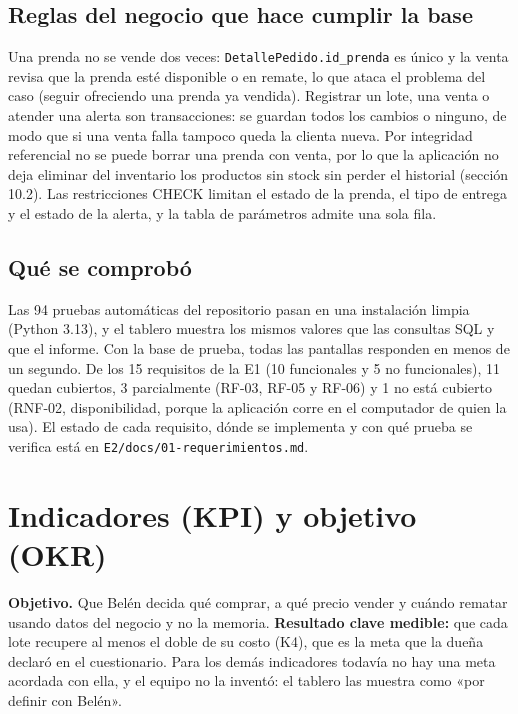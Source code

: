 \documentclass[11pt,letterpaper]{article}
\begin{document}
\subsection{Reglas del negocio que hace cumplir la base}

Una prenda no se vende dos veces: \texttt{DetallePedido.id\_\allowbreak{}prenda} es único y la venta revisa que la prenda esté disponible o en remate, lo que ataca el problema del caso (seguir ofreciendo una prenda ya vendida). Registrar un lote, una venta o atender una alerta son transacciones: se guardan todos los cambios o ninguno, de modo que si una venta falla tampoco queda la clienta nueva. Por integridad referencial no se puede borrar una prenda con venta, por lo que la aplicación no deja eliminar del inventario los productos sin stock sin perder el historial (sección 10.2). Las restricciones CHECK limitan el estado de la prenda, el tipo de entrega y el estado de la alerta, y la tabla de parámetros admite una sola fila.

\subsection{Qué se comprobó}

Las 94 pruebas automáticas del repositorio pasan en una instalación limpia (Python 3.13), y el tablero muestra los mismos valores que las consultas SQL y que el informe. Con la base de prueba, todas las pantallas responden en menos de un segundo. De los 15 requisitos de la E1 (10 funcionales y 5 no funcionales), 11 quedan cubiertos, 3 parcialmente (RF-03, RF-05 y RF-06) y 1 no está cubierto (RNF-02, disponibilidad, porque la aplicación corre en el computador de quien la usa). El estado de cada requisito, dónde se implementa y con qué prueba se verifica está en \texttt{E2/\allowbreak{}docs/\allowbreak{}01-requerimientos.md}.

\section{Indicadores (KPI) y objetivo (OKR)}

\textbf{Objetivo.} Que Belén decida qué comprar, a qué precio vender y cuándo rematar usando datos del negocio y no la memoria. \textbf{Resultado clave medible:} que cada lote recupere al menos el doble de su costo (K4), que es la meta que la dueña declaró en el cuestionario. Para los demás indicadores todavía no hay una meta acordada con ella, y el equipo no la inventó: el tablero las muestra como «por definir con Belén».
\end{document}

